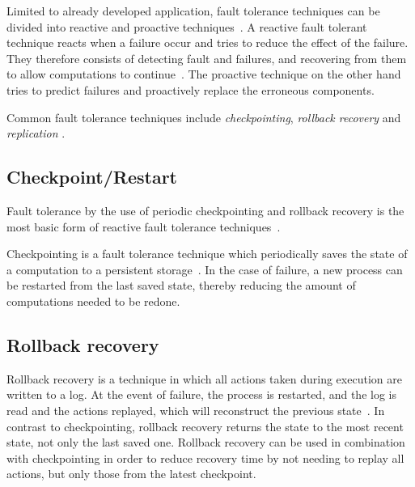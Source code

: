 \documentclass{cslthse-msc}
\begin{document}
Limited to already developed application, fault tolerance techniques can be divided into reactive and proactive techniques~\cite{faultToleranceChallenges}. A reactive fault tolerant technique reacts when a failure occur and tries to reduce the effect of the failure. They therefore consists of detecting fault and failures, and recovering from them to allow computations to continue~\cite{relGridSystems}. The proactive technique on the other hand tries to predict failures and proactively replace the erroneous components.

Common fault tolerance techniques include \emph{checkpointing}, \emph{rollback recovery} and \emph{replication} \cite{relGridSystems}.

\subsection{Checkpoint/Restart} \label{subsec:background_checkpoint}
Fault tolerance by the use of periodic checkpointing and rollback recovery is the most basic form of reactive fault tolerance techniques~\cite{surveyFaultParallel}.

Checkpointing is a fault tolerance technique which periodically saves the state of a computation to a persistent storage~\cite{relGridSystems, surveyFaultParallel}. In the case of failure, a new process can be restarted from the last saved state, thereby reducing the amount of computations needed to be redone.


\subsection{Rollback recovery} \label{subsec:background_rollback}
Rollback recovery is a technique in which all actions taken during execution are written to a log. At the event of failure, the process is restarted, and the log is read and the actions replayed, which will reconstruct the previous state~\cite{surveyFaultParallel}. In contrast to checkpointing, rollback recovery returns the state to the most recent state, not only the last saved one. Rollback recovery can be used in combination with checkpointing in order to reduce recovery time by not needing to replay all actions, but only those from the latest checkpoint.
\end{document}
